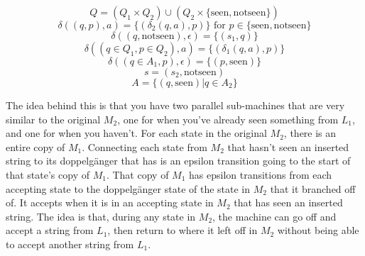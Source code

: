 \documentclass[11pt]{article}
\begin{document}
\begin{solution}
    \[
        Q = (Q_1 \times Q_2) \cup (Q_2 \times \{\text{seen}, \text{notseen}\})
    \]
    \[
        \delta((q, p), a) = \{(\delta_2(q, a), p)\}\text{ for } p \in \{\text{seen}, \text{notseen}\}
    \]
    \[
        \delta((q, \text{notseen}), \epsilon) = \{(s_1, q)\}
    \]
    \[
        \delta((q \in Q_1, p \in Q_2), a) = \{(\delta_1(q, a), p)\}
    \]
    \[
        \delta((q \in A_1, p), \epsilon) = \{(p, \text{seen})\}
    \]
    \[
        s = (s_2, \text{notseen})
    \]
    \[
        A = \{(q, \text{seen}) | q \in A_2\}
    \]

    The idea behind this is that you have two parallel sub-machines that are very similar to the original $M_2$, one for when you've already seen something from $L_1$, and one for when you haven't. For each state in the original $M_2$, there is an entire copy of $M_1$. Connecting each state from $M_2$ that hasn't seen an inserted string to its doppelg{\"a}nger that has is an epsilon transition going to the start of that state's copy of $M_1$. That copy of $M_1$ has epsilon transitions from each accepting state to the doppelg{\"a}nger state of the state in $M_2$ that it branched off of. It accepts when it is in an accepting state in $M_2$ that has seen an inserted string. The idea is that, during any state in $M_2$, the machine can go off and accept a string from $L_1$, then return to where it left off in $M_2$ without being able to accept another string from $L_1$.
\end{solution}
\end{document}

